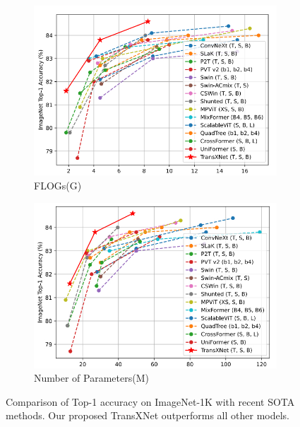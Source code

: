 \documentclass[a4paper]{ctexart}
\begin{document}
		\begin{figure}[htbp]
			\centering
			\begin{subfigure}{0.45\textwidth}
				\includegraphics[width=\linewidth]{picture/LLIE/Experiment/FLOGs(G)}
				\captionsetup{font=scriptsize}
				\caption{FLOGs(G)}
				\label{fig: FLOGs(G)}	
			\end{subfigure}
			\begin{subfigure}{0.45\textwidth}
				\includegraphics[width=\linewidth]{picture/LLIE/Experiment/Number of Parameters(M)}
				\captionsetup{font=scriptsize}
				\caption{Number of Parameters(M)}
				\label{fig: Number of Parameters(M)}	
			\end{subfigure}
			\caption{Comparison of Top-1 accuracy on ImageNet-1K with recent SOTA
				methods. Our proposed TransXNet outperforms all other models.}
			\label{fig: TransXNet Outperforms}
		\end{figure}
		
\end{document}
